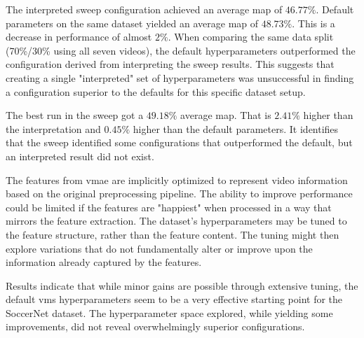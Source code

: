 The interpreted sweep configuration achieved an average \acrshort{map} of $46.77\%$. Default parameters on the same dataset yielded an average \acrshort{map} of $48.73\%$. This is a decrease in performance of almost $2\%$. When comparing the same data split (70\%/30\% using all seven videos), the default hyperparameters outperformed the configuration derived from interpreting the sweep results. This suggests that creating a single "interpreted" set of hyperparameters was unsuccessful in finding a configuration superior to the defaults for this specific dataset setup.

The best run in the sweep got a $49.18\%$ average \acrshort{map}. That is $2.41\%$ higher than the interpretation and $0.45\%$ higher than the default parameters. It identifies that the sweep identified some configurations that outperformed the default, but an interpreted result did not exist. 

The features from \acrshort{vmae} are implicitly optimized to represent video information based on the original preprocessing pipeline. The ability to improve performance could be limited if the features are "happiest" when processed in a way that mirrors the feature extraction. The dataset's hyperparameters may be tuned to the feature structure, rather than the feature content. The tuning might then explore variations that do not fundamentally alter or improve upon the information already captured by the features. 

Results indicate that while minor gains are possible through extensive tuning, the default \acrshort{vms} hyperparameters seem to be a very effective starting point for the SoccerNet dataset. The hyperparameter space explored, while yielding some improvements, did not reveal overwhelmingly superior configurations.

